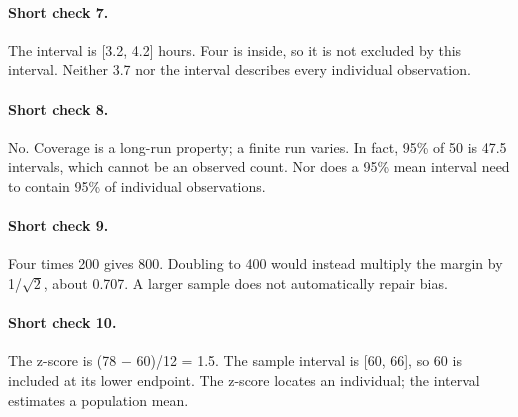 \documentclass[11pt,letterpaper]{article}
\begin{document}
{\paragraph{Short check 7.}
The interval is [3.2, 4.2] hours. Four is inside, so it is not excluded by this interval. Neither 3.7 nor the interval describes every individual observation.


\paragraph{Short check 8.}
No. Coverage is a long-run property; a finite run varies. In fact, 95\% of 50 is 47.5 intervals, which cannot be an observed count. Nor does a 95\% mean interval need to contain 95\% of individual observations.


\paragraph{Short check 9.}
Four times 200 gives 800. Doubling to 400 would instead multiply the margin by 1/\(\sqrt{2}\), about 0.707. A larger sample does not automatically repair bias.


\paragraph{Short check 10.}
The z-score is (78 $-$ 60)/12 = 1.5. The sample interval is [60, 66], so 60 is included at its lower endpoint. The z-score locates an individual; the interval estimates a population mean.


\clearpage

}
\end{document}
